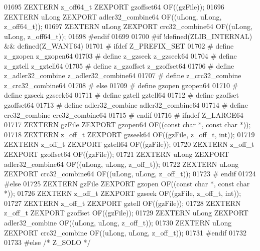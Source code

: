 \begin{DoxyCode}
01695    ZEXTERN z\_off64\_t ZEXPORT gzoffset64 OF((gzFile));
01696    ZEXTERN uLong ZEXPORT adler32\_combine64 OF((uLong, uLong, z\_off64\_t));
01697    ZEXTERN uLong ZEXPORT crc32\_combine64 OF((uLong, uLong, z\_off64\_t));
01698 \textcolor{preprocessor}{#endif}
01699 
01700 \textcolor{preprocessor}{#if !defined(ZLIB\_INTERNAL) && defined(Z\_WANT64)}
01701 \textcolor{preprocessor}{#  ifdef Z\_PREFIX\_SET}
01702 \textcolor{preprocessor}{#    define z\_gzopen z\_gzopen64}
01703 \textcolor{preprocessor}{#    define z\_gzseek z\_gzseek64}
01704 \textcolor{preprocessor}{#    define z\_gztell z\_gztell64}
01705 \textcolor{preprocessor}{#    define z\_gzoffset z\_gzoffset64}
01706 \textcolor{preprocessor}{#    define z\_adler32\_combine z\_adler32\_combine64}
01707 \textcolor{preprocessor}{#    define z\_crc32\_combine z\_crc32\_combine64}
01708 \textcolor{preprocessor}{#  else}
01709 \textcolor{preprocessor}{#    define gzopen gzopen64}
01710 \textcolor{preprocessor}{#    define gzseek gzseek64}
01711 \textcolor{preprocessor}{#    define gztell gztell64}
01712 \textcolor{preprocessor}{#    define gzoffset gzoffset64}
01713 \textcolor{preprocessor}{#    define adler32\_combine adler32\_combine64}
01714 \textcolor{preprocessor}{#    define crc32\_combine crc32\_combine64}
01715 \textcolor{preprocessor}{#  endif}
01716 \textcolor{preprocessor}{#  ifndef Z\_LARGE64}
01717      ZEXTERN gzFile ZEXPORT gzopen64 OF((\textcolor{keyword}{const} \textcolor{keywordtype}{char} *, \textcolor{keyword}{const} \textcolor{keywordtype}{char} *));
01718      ZEXTERN z\_off\_t ZEXPORT gzseek64 OF((gzFile, z\_off\_t, \textcolor{keywordtype}{int}));
01719      ZEXTERN z\_off\_t ZEXPORT gztell64 OF((gzFile));
01720      ZEXTERN z\_off\_t ZEXPORT gzoffset64 OF((gzFile));
01721      ZEXTERN uLong ZEXPORT adler32\_combine64 OF((uLong, uLong, z\_off\_t));
01722      ZEXTERN uLong ZEXPORT crc32\_combine64 OF((uLong, uLong, z\_off\_t));
01723 \textcolor{preprocessor}{#  endif}
01724 \textcolor{preprocessor}{#else}
01725    ZEXTERN gzFile ZEXPORT gzopen OF((\textcolor{keyword}{const} \textcolor{keywordtype}{char} *, \textcolor{keyword}{const} \textcolor{keywordtype}{char} *));
01726    ZEXTERN z\_off\_t ZEXPORT gzseek OF((gzFile, z\_off\_t, \textcolor{keywordtype}{int}));
01727    ZEXTERN z\_off\_t ZEXPORT gztell OF((gzFile));
01728    ZEXTERN z\_off\_t ZEXPORT gzoffset OF((gzFile));
01729    ZEXTERN uLong ZEXPORT adler32\_combine OF((uLong, uLong, z\_off\_t));
01730    ZEXTERN uLong ZEXPORT crc32\_combine OF((uLong, uLong, z\_off\_t));
01731 \textcolor{preprocessor}{#endif}
01732 
01733 \textcolor{preprocessor}{#else }\textcolor{comment}{/* Z\_SOLO */}\textcolor{preprocessor}{}

\end{DoxyCode}
